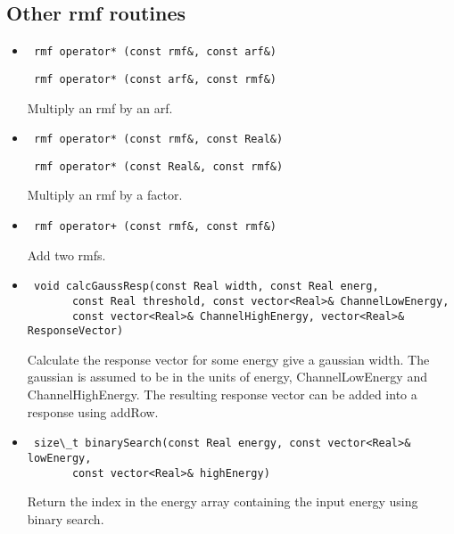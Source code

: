 \documentclass[11pt]{book}
\begin{document}
\subsection{Other rmf routines}

\begin{itemize}

\item  \begin{verbatim} rmf operator* (const rmf&, const arf&) \end{verbatim}
       \begin{verbatim} rmf operator* (const arf&, const rmf&) \end{verbatim}

          Multiply an rmf by an arf.

\item  \begin{verbatim} rmf operator* (const rmf&, const Real&) \end{verbatim}
       \begin{verbatim} rmf operator* (const Real&, const rmf&) \end{verbatim}

          Multiply an rmf by a factor.

\item  \begin{verbatim} rmf operator+ (const rmf&, const rmf&) \end{verbatim}

          Add two rmfs.

\item  \begin{verbatim} void calcGaussResp(const Real width, const Real energ, 
       const Real threshold, const vector<Real>& ChannelLowEnergy, 
       const vector<Real>& ChannelHighEnergy, vector<Real>& ResponseVector)  \end{verbatim}

          Calculate the response vector for some energy give a gaussian width.
          The gaussian is assumed to be in the units of energy,
          ChannelLowEnergy and ChannelHighEnergy. The resulting
          response vector can be added into a response using addRow.

\item  \begin{verbatim} size\_t binarySearch(const Real energy, const vector<Real>& lowEnergy,
       const vector<Real>& highEnergy) \end{verbatim}

          Return the index in the energy array containing the input 
          energy using binary search.

\end{itemize}
\end{document}
